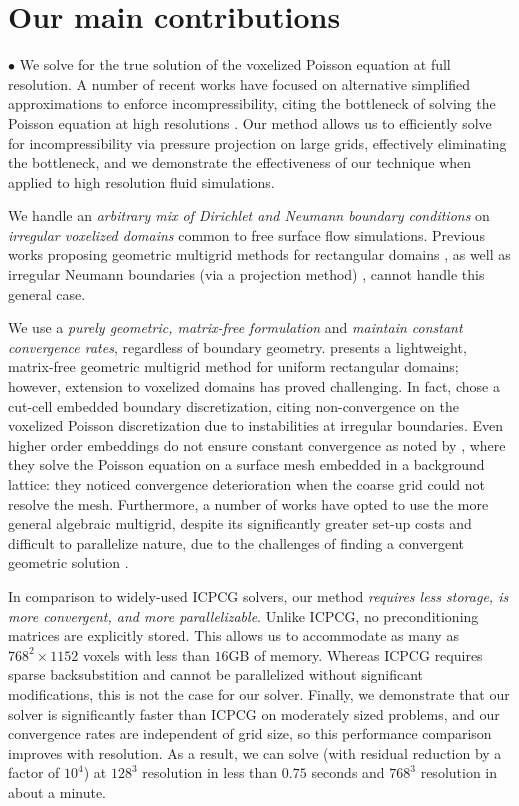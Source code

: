 \section*{Our main contributions}
\vspace*{-4pt}

\noindent$\bullet$  We solve for the true solution of the voxelized Poisson equation at full resolution.  A number of recent works have focused on alternative simplified approximations to enforce incompressibility, citing the bottleneck of solving the Poisson equation at high resolutions \cite{HG09}.   Our method allows us to efficiently solve for incompressibility via pressure projection on large grids, effectively eliminating the bottleneck, and we demonstrate the effectiveness of our technique when applied to high resolution fluid simulations.  

We handle an \emph{arbitrary mix of Dirichlet and Neumann boundary conditions} on \emph{irregular voxelized domains} common to free surface flow simulations. Previous works proposing geometric multigrid methods for rectangular domains \cite{TO94,AF96,BWR05,BWK06,KH08}, as well as irregular Neumann boundaries (via a projection method) \cite{MCPN08}, cannot handle this general case.  

We use a \emph{purely geometric, matrix-free formulation} and \emph{maintain constant convergence rates}, regardless of boundary geometry.  \cite{BWR05} presents a lightweight, matrix-free geometric multigrid method for uniform rectangular domains; however, extension to voxelized domains has proved challenging.  In fact, \cite{HMB05} chose a cut-cell embedded boundary discretization, citing non-convergence on the voxelized Poisson discretization due to instabilities at irregular boundaries.  Even higher order embeddings do not ensure constant convergence as noted by \cite{CLB09}, where they solve the Poisson equation on a surface mesh embedded in a background lattice: they noticed convergence deterioration when the coarse grid could not resolve the mesh.  Furthermore, a number of works have opted to use the more general algebraic multigrid, despite its significantly greater set-up costs and difficult to parallelize nature\cite{trottenberg:2001:multigrid}, due to the challenges of finding a convergent geometric solution \cite{CNF07, CGR04, PM04}.

In comparison to widely-used ICPCG solvers, our method \emph{requires less storage, is more convergent, and more parallelizable}.  Unlike ICPCG, no preconditioning matrices are explicitly stored.  This allows us to accommodate as many as $768^2\!\times\!1152$ voxels with less than $16$GB of memory. Whereas ICPCG requires sparse backsubstition and cannot be parallelized without significant modifications, this is not the case for our solver.  Finally, we demonstrate that our solver is significantly faster than ICPCG on moderately sized problems, and our convergence rates are independent of grid size, so this performance comparison improves with resolution.  As a result, we can solve (with residual reduction by a factor of $10^4$) at $128^3$ resolution in less than $0.75$ seconds and $768^3$ resolution in about a minute.

